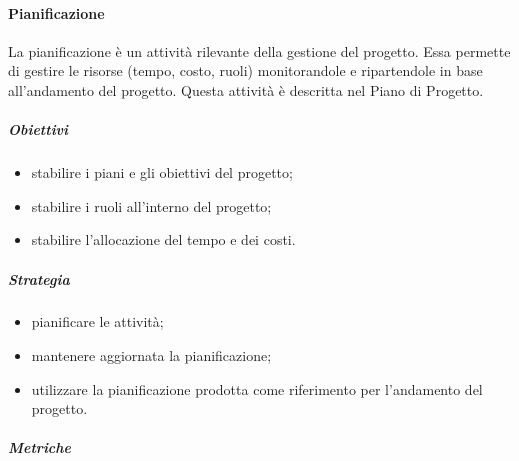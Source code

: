         \paragraph{Pianificazione}
            La pianificazione è un attività rilevante della gestione del progetto. Essa permette di gestire le risorse (tempo, costo, ruoli) monitorandole e ripartendole in base all'andamento del progetto.
            Questa attività è descritta nel Piano di Progetto.
            \subparagraph{Obiettivi}
                \begin{itemize}
                    \item stabilire i piani e gli obiettivi del progetto;
                    \item stabilire i ruoli all'interno del progetto;
                    \item stabilire l'allocazione del tempo e dei costi.
                \end{itemize}
            \subparagraph{Strategia}
                \begin{itemize}
                    \item pianificare le attività;
                    \item mantenere aggiornata la pianificazione;
                    \item utilizzare la pianificazione prodotta come riferimento per l'andamento del progetto.
                \end{itemize}
            \subparagraph{Metriche}
